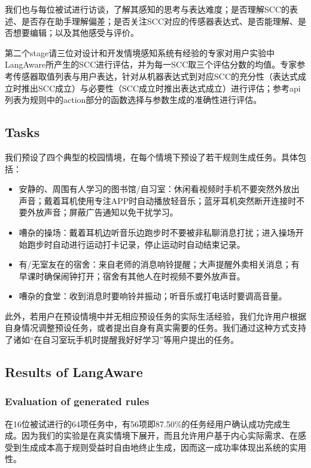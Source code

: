 我们也与每位被试进行访谈，了解其感知的思考与表达难度；是否理解SCC的表述、是否存在助手理解偏差；是否关注SCC对应的传感器表达式、是否能理解、是否想要编辑；以及其他感受与评价。

第二个stage请三位对设计和开发情境感知系统有经验的专家对用户实验中LangAware所产生的SCC进行评估，并为每一SCC取三个评估分数的均值。专家参考传感器取值列表与用户表达，针对从机器表达式到对应SCC的充分性（表达式成立时推出SCC成立）与必要性（SCC成立时推出表达式成立）进行评估；参考api列表为规则中的action部分的函数选择与参数生成的准确性进行评估。


\subsection{Tasks}

我们预设了四个典型的校园情境，在每个情境下预设了若干规则生成任务。具体包括：
\begin{itemize}
    \item 安静的、周围有人学习的图书馆/自习室：休闲看视频时手机不要突然外放出声音；戴着耳机使用专注APP时自动播放轻音乐；蓝牙耳机突然断开连接时不要外放声音；屏蔽广告通知以免干扰学习。
    \item 嘈杂的操场：戴着耳机边听音乐边跑步时不要被非私聊消息打扰；进入操场开始跑步时自动进行运动打卡记录，停止运动时自动结束记录。
    \item 有/无室友在的宿舍：来自老师的消息响铃提醒；大声提醒外卖相关消息；有早课时确保闹钟打开；宿舍有其他人在时视频不要外放声音。
    \item 嘈杂的食堂：收到消息时要响铃并振动；听音乐或打电话时要调高音量。
\end{itemize}
此外，若用户在预设情境中并无相应预设任务的实际生活经验，我们允许用户根据自身情况调整预设任务，或者提出自身有真实需要的任务。我们通过这种方式支持了诸如“在自习室玩手机时提醒我好好学习”等用户提出的任务。

\subsection{Results of LangAware}

\subsubsection{Evaluation of generated rules}

    在16位被试进行的64项任务中，有56项即87.50\%的任务经用户确认成功完成生成。因为我们的实验是在真实情境下展开，而且允许用户基于内心实际需求、在感受到生成成本高于规则受益时自由地终止生成，因而这一成功率体现出系统的实用性。


